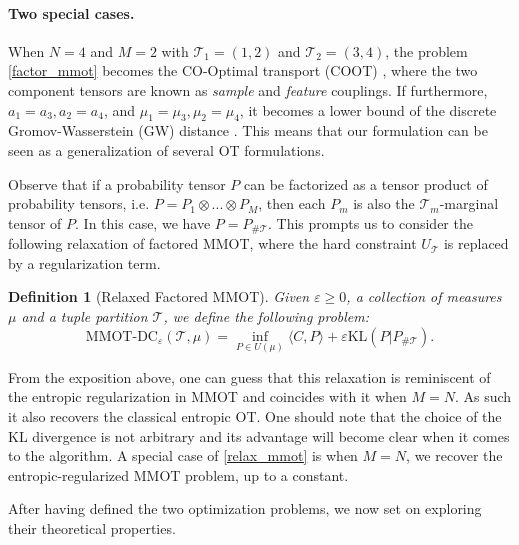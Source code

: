 \documentclass{article}
\newtheorem{definition}{Definition}[section]
\begin{document}
\paragraph{Two special cases.} When $N = 4$ and $M=2$ with $\mathcal T_1 = (1,2)$ and $\mathcal T_2 = (3,4)$, the problem 
\ref{factor_mmot} becomes the CO-Optimal transport (COOT) \citep{Redko20}, where the two component tensors are known as 
\textit{sample} and \textit{feature} couplings. If furthermore, $a_1 = a_3, a_2=a_4$, and $\mu_1 = \mu_3, \mu_2=\mu_4$, it becomes a 
lower bound of the discrete Gromov-Wasserstein (GW) distance \citep{Memoli11}. This means that our formulation can be seen as a 
generalization of several OT formulations.

Observe that if a probability tensor $P$ can be factorized as a tensor product of probability tensors, i.e. 
$P = P_1 \otimes ... \otimes P_M$, then each $P_m$ is also the $\mathcal T_m$-marginal tensor of $P$. In this case, 
we have $P = P_{\# \mathcal T}$. This prompts us to consider the following relaxation of factored MMOT, where the hard constraint 
$U_{\mathcal T}$ is replaced by a regularization term.
\begin{definition}[Relaxed Factored MMOT]
  Given $\varepsilon \geq 0$, a collection of measures $\mu$ and a tuple partition $\mathcal T$, 
  we define the following problem:
  \begin{equation} \label{relax_mmot}
    \text{MMOT-DC}_{\varepsilon}( \mathcal T, \mu) = 
    \inf_{P \in U(\mu)} \langle C, P \rangle + \varepsilon \text{KL}(P \vert P_{\# \mathcal T}).
  \end{equation}
\end{definition}
From the exposition above, one can guess that this relaxation is reminiscent of the entropic regularization in MMOT and 
coincides with it when $M = N$. As such it also recovers the classical entropic OT. One should note that the choice of the KL 
divergence is not arbitrary and its advantage will become clear when it comes to the algorithm. %
A special case of \ref{relax_mmot} is when $M = N$, we recover the entropic-regularized MMOT problem, up to a constant.

After having defined the two optimization problems, we now set on exploring their theoretical properties. 
\end{document}

